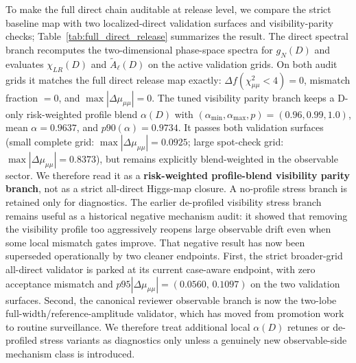 \documentclass[aps,prd,onecolumn,notitlepage,nofootinbib,superscriptaddress,11pt,floatfix]{revtex4-2}
\begin{document}
To make the full direct chain auditable at release level, we compare the strict baseline map with two localized-direct validation surfaces and visibility-parity checks; Table~\ref{tab:full_direct_release} summarizes the result.
The direct spectral branch recomputes the two-dimensional phase-space spectra for $g_N(D)$ and evaluates $\chi_{LR}(D)$ and $\tilde A_\ell(D)$ on the active validation grids. On both audit grids it matches the full direct release map exactly: $\Delta f(\chi^2_{\mu\mu}<4)=0$, mismatch fraction $=0$, and $\max|\Delta\mu_{\mu\mu}|=0$.
The tuned visibility parity branch keeps a D-only risk-weighted profile blend $\alpha(D)$ with $(\alpha_{\min},\alpha_{\max},p)=(0.96,0.99,1.0)$, mean $\alpha=0.9637$, and $p90(\alpha)=0.9734$. It passes both validation surfaces (small complete grid: $\max|\Delta\mu_{\mu\mu}|=0.0925$; large spot-check grid: $\max|\Delta\mu_{\mu\mu}|=0.8373$), but remains explicitly blend-weighted in the observable sector. We therefore read it as a \textbf{risk-weighted profile-blend visibility parity branch}, not as a strict all-direct Higgs-map closure. A no-profile stress branch is retained only for diagnostics.
The earlier de-profiled visibility stress branch remains useful as a historical negative mechanism audit: it showed that removing the visibility profile too aggressively reopens large observable drift even when some local mismatch gates improve. That negative result has now been superseded operationally by two cleaner endpoints. First, the strict broader-grid all-direct validator is parked at its current case-aware endpoint, with zero acceptance mismatch and $p95|\Delta\mu_{\mu\mu}|=(0.0560,\,0.1097)$ on the two validation surfaces. Second, the canonical reviewer observable branch is now the two-lobe full-width/reference-amplitude validator, which has moved from promotion work to routine surveillance. We therefore treat additional local \(\alpha(D)\) retunes or de-profiled stress variants as diagnostics only unless a genuinely new observable-side mechanism class is introduced.
\end{document}
